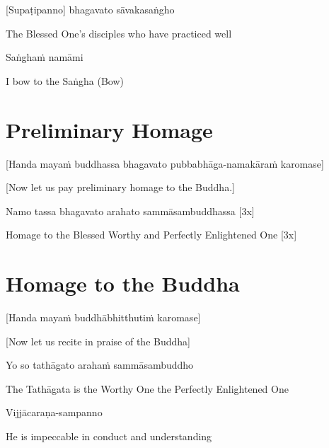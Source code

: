 [Supaṭipanno] bhagavato sāvakasaṅgho

\begin{cprenglish}
  The Blessed One’s disciples who have practiced well
\end{cprenglish}

Saṅghaṁ namāmi

\begin{cprenglish}
  I bow to the Saṅgha \hfill{(Bow)}
\end{cprenglish}

\section{Preliminary Homage}
\label{preliminary-homage}

\begin{center}
  [Handa mayaṁ buddhassa bhagavato pubbabhāga-namakāraṁ karomase]
\end{center}

\begin{center}
  [Now let us pay preliminary homage to the Buddha.]
\end{center}

Namo tassa bhagavato arahato sammāsambuddhassa \hfill{[3x]}

\begin{cprenglish}
  Homage to the Blessed Worthy and Perfectly Enlightened One [3x]
\end{cprenglish}

\clearpage

\section{Homage to the Buddha}
\label{homage-buddha}

\begin{center}
  [Handa mayaṁ buddhābhitthutiṁ karomase]
\end{center}
\begin{center}
  [Now let us recite in praise of the Buddha]
\end{center}

Yo so tathāgato arahaṁ sammāsambuddho

\begin{cprenglish}
  The Tathāgata is the Worthy One the Perfectly Enlightened One
\end{cprenglish}

Vijjācaraṇa-sampanno

\begin{cprenglish}
  He is impeccable in conduct and understanding
\end{cprenglish}


